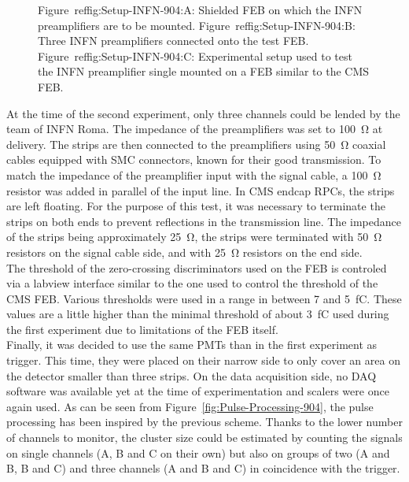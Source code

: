 \begin{figure}[H]
\begin{subfigure}{\linewidth}
			\caption{\label{fig:Setup-INFN-904:C}}
		\end{subfigure}
		\caption{\label{fig:Setup-INFN-904} Figure~ref{fig:Setup-INFN-904:A}: Shielded \acl{FEB} on which the INFN preamplifiers are to be mounted. Figure~ref{fig:Setup-INFN-904:B}: Three INFN preamplifiers connected onto the test FEB. Figure~ref{fig:Setup-INFN-904:C}: Experimental setup used to test the INFN preamplifier single mounted on a FEB similar to the CMS FEB.}
    \end{figure}
	
	At the time of the second experiment, only three channels could be lended by the team of INFN Roma. The impedance of the preamplifiers was set to \SI{100}{\ohm} at delivery. The strips are then connected to the preamplifiers using \SI{50}{\ohm} coaxial cables equipped with SMC connectors, known for their good transmission. To match the impedance of the preamplifier input with the signal cable, a \SI{100}{\ohm} resistor was added in parallel of the input line. In CMS endcap RPCs, the strips are left floating. For the purpose of this test, it was necessary to terminate the strips on both ends to prevent reflections in the transmission line. The impedance of the strips being approximately \SI{25}{\ohm}, the strips were terminated with \SI{50}{\ohm} resistors on the signal cable side, and with \SI{25}{\ohm} resistors on the end side.\\
	The threshold of the zero-crossing discriminators used on the FEB is controled via a labview interface similar to the one used to control the threshold of the CMS FEB. Various thresholds were used in a range in between 7 and \SI{5}{fC}. These values are a little higher than the minimal threshold of about \SI{3}{fC} used during the first experiment due to limitations of the FEB itself.\\
	Finally, it was decided to use the same PMTs than in the first experiment as trigger. This time, they were placed on their narrow side to only cover an area on the detector smaller than three strips. On the data acquisition side, no DAQ software was available yet at the time of experimentation and scalers were once again used. As can be seen from Figure~\ref{fig:Pulse-Processing-904}, the pulse processing has been inspired by the previous scheme. Thanks to the lower number of channels to monitor, the cluster size could be estimated by counting the signals on single channels (A, B and C on their own) but also on groups of two (A and B, B and C) and three channels (A and B and C) in coincidence with the trigger.
	
